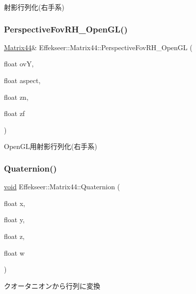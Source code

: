 射影行列化(右手系) 

\mbox{\label{struct_effekseer_1_1_matrix44_a7d8f52cbf92efe51564a2314a212df78}} 
\subsubsection{\texorpdfstring{Perspective\+Fov\+R\+H\+\_\+\+Open\+G\+L()}{PerspectiveFovRH\_OpenGL()}}
{\footnotesize\ttfamily \mbox{\hyperlink{struct_effekseer_1_1_matrix44}{Matrix44}}\& Effekseer\+::\+Matrix44\+::\+Perspective\+Fov\+R\+H\+\_\+\+Open\+GL (\begin{DoxyParamCaption}\item[{float}]{ovY,  }\item[{float}]{aspect,  }\item[{float}]{zn,  }\item[{float}]{zf }\end{DoxyParamCaption})}



Open\+G\+L用射影行列化(右手系) 

\mbox{\label{struct_effekseer_1_1_matrix44_a18702bbfd281cc5e026dcf82d5960030}} 
\subsubsection{\texorpdfstring{Quaternion()}{Quaternion()}}
{\footnotesize\ttfamily \mbox{\hyperlink{namespace_effekseer_ab34c4088e512200cf4c2716f168deb56}{void}} Effekseer\+::\+Matrix44\+::\+Quaternion (\begin{DoxyParamCaption}\item[{float}]{x,  }\item[{float}]{y,  }\item[{float}]{z,  }\item[{float}]{w }\end{DoxyParamCaption})}



クオータニオンから行列に変換 

